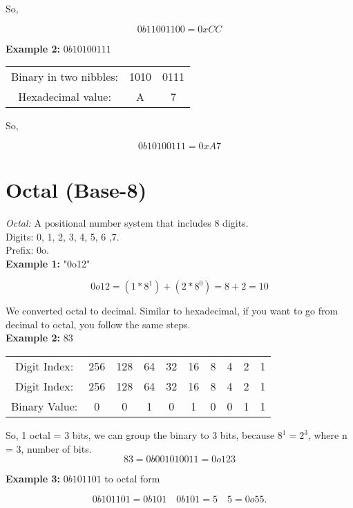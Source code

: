 \documentclass{article}
\begin{document}
So,

\[
0b11001100 = 0xCC
\]

\noindent \textbf{Example 2:} $0b1010 0111$

\begin{center}
\begin{tabular}{c c c}
Binary in two nibbles: & 1010 & 0111 \\
Hexadecimal value: & A & 7 \\
\end{tabular}
\end{center} 

So,

\[
0b1010 0111 = 0xA7
\]

\section{Octal (Base-8)}
\textit{Octal:} A positional number system that includes 8 digits. \\

\noindent Digits: 0, 1, 2, 3, 4, 5, 6 ,7. \\

\noindent Prefix: 0o. \\

\noindent \textbf{Example 1:} "0o12"

\[
0o12 = (1 * 8^1) + (2 * 8^0) = 8 + 2 = 10
\]

We converted octal to decimal. Similar to hexadecimal, if you want to go from decimal to octal, you follow
the same steps. \\

\noindent \textbf{Example 2:} $83$

\begin{center}
\begin{tabular}{c c c c c c c c c c}
Digit Index: & 256 & 128 & 64 & 32 & 16 & 8 & 4 & 2 & 1 \\ 
Digit Index: & 256 & 128 & 64 & 32 & 16 & 8 & 4 & 2 & 1 \\
Binary Value: & 0 & 0 & 1 & 0 & 1 & 0 & 0 & 1 & 1 \\
\end{tabular}
\end{center}

So, 1 octal = 3 bits, we can group the binary to 3 bits, because $8^1 = 2^3$, where n = 3, number 
of bits.
\[
83 = 0b001 010 011 = 0o123
\]

\noindent \textbf{Example 3:} $0b101101$ to octal form

\[
0b101101 = 0b101\quad 0b101 = 5\quad 5 = 0o55.
\]
\end{document}
